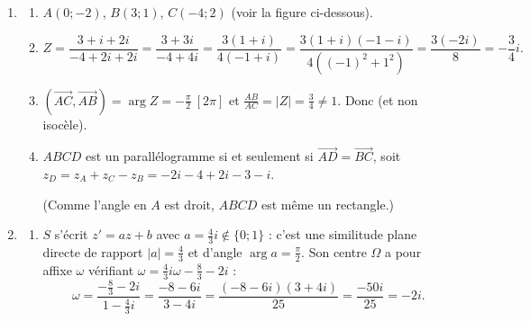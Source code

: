 \begin{enumerate}
\begin{enumerate}
		\end{enumerate}
		\item \begin{enumerate}
			\item {} $A(0;-2)$, $B(3;1)$, $C(-4;2)$ (voir la figure ci-dessous).
			\item {}
				\[
					Z = \frac{3+i+2i}{-4+2i+2i} = \frac{3+3i}{-4+4i} = \frac{3(1+i)}{4(-1+i)}
					  = \frac{3(1+i)(-1-i)}{4\left((-1)^2+1^2\right)} = \frac{3(-2i)}{8} = -\frac{3}{4}i.
				\]

			\item {}
				$\left(\overrightarrow{AC},\overrightarrow{AB}\right) = \arg Z = -\frac{\pi}{2}~[2\pi]$
				et $\frac{AB}{AC} = |Z| = \frac{3}{4} \neq 1$.
				Donc  (et non isocèle).
			\item {}
				$ABCD$ est un parallélogramme si et seulement si $\overrightarrow{AD} = \overrightarrow{BC}$,
				soit $z_D = z_A + z_C - z_B = -2i - 4 + 2i - 3 - i$.

				(Comme l'angle en $A$ est droit, $ABCD$ est même un rectangle.)
		\end{enumerate}
		\item \begin{enumerate}
			\item {}
				$S$ s'écrit $z' = az + b$ avec $a = \frac{4}{3}i \notin \{0;1\}$ :
				c'est une similitude plane directe de rapport $|a| = \frac{4}{3}$ et d'angle $\arg a = \frac{\pi}{2}$.
				Son centre $\Omega$ a pour affixe $\omega$ vérifiant $\omega = \frac{4}{3}i\omega - \frac{8}{3} - 2i$ :
				\[
					\omega = \frac{-\frac{8}{3}-2i}{1-\frac{4}{3}i} = \frac{-8-6i}{3-4i} = \frac{(-8-6i)(3+4i)}{25} = \frac{-50i}{25} = -2i.
				\]


\end{enumerate}
\end{enumerate}
